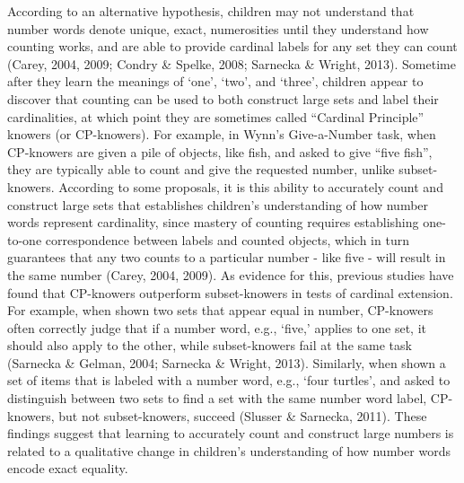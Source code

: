 \documentclass[
  man,floatsintext]{apa7}
\begin{document}
According to an alternative hypothesis, children may not understand that number words denote unique, exact, numerosities until they understand how counting works, and are able to provide cardinal labels for any set they can count (Carey, 2004, 2009; Condry \& Spelke, 2008; Sarnecka \& Wright, 2013). Sometime after they learn the meanings of `one', `two', and `three', children appear to discover that counting can be used to both construct large sets and label their cardinalities, at which point they are sometimes called ``Cardinal Principle'' knowers (or CP-knowers). For example, in Wynn's Give-a-Number task, when CP-knowers are given a pile of objects, like fish, and asked to give ``five fish'', they are typically able to count and give the requested number, unlike subset-knowers. According to some proposals, it is this ability to accurately count and construct large sets that establishes children's understanding of how number words represent cardinality, since mastery of counting requires establishing one-to-one correspondence between labels and counted objects, which in turn guarantees that any two counts to a particular number - like five - will result in the same number (Carey, 2004, 2009). As evidence for this, previous studies have found that CP-knowers outperform subset-knowers in tests of cardinal extension. For example, when shown two sets that appear equal in number, CP-knowers often correctly judge that if a number word, e.g., `five,' applies to one set, it should also apply to the other, while subset-knowers fail at the same task (Sarnecka \& Gelman, 2004; Sarnecka \& Wright, 2013). Similarly, when shown a set of items that is labeled with a number word, e.g., `four turtles', and asked to distinguish between two sets to find a set with the same number word label, CP-knowers, but not subset-knowers, succeed (Slusser \& Sarnecka, 2011). These findings suggest that learning to accurately count and construct large numbers is related to a qualitative change in children's understanding of how number words encode exact equality.
\end{document}

